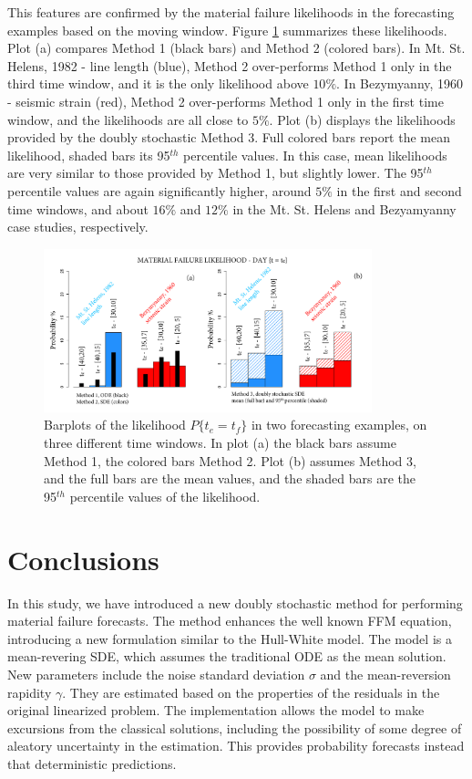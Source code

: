\documentclass{article}
\begin{document}
This features are confirmed by the material failure likelihoods in the forecasting examples based on the moving window. Figure \ref{Fig16} summarizes these likelihoods. Plot (a) compares Method 1 (black bars) and Method 2 (colored bars). In Mt. St. Helens, 1982 - line length (blue), Method 2 over-performs Method 1 only in the third time window, and it is the only likelihood above $10\%$. In Bezymyanny, 1960 - seismic strain (red), Method 2 over-performs Method 1 only in the first time window, and the likelihoods are all close to $5\%$. Plot (b) displays the likelihoods provided by the doubly stochastic Method 3. Full colored bars report the mean likelihood, shaded bars its 95$^{th}$ percentile values. In this case, mean likelihoods are very similar to those provided by Method 1, but slightly lower. The 95$^{th}$ percentile values are again significantly higher, around $5\%$ in the first and second time windows, and about $16\%$ and $12\%$ in the Mt. St. Helens and Bezyamyanny case studies, respectively.

\begin{figure}[H]
\centering
\includegraphics[width=0.85\textwidth]{Fig16_plus.png}
\caption{Barplots of the likelihood $P\{t_e=t_f\}$ in two forecasting examples, on three different time windows. In plot (a) the black bars assume Method 1, the colored bars Method 2. Plot (b) assumes Method 3, and the full bars are the mean values, and the shaded bars are the 95$^{th}$ percentile values of the likelihood.}
\label{Fig16}
\end{figure}

\section{Conclusions}
In this study, we have introduced a new doubly stochastic method for performing material failure forecasts. The method enhances the well known FFM equation, introducing a new formulation similar to the Hull-White model. The model is a mean-revering SDE, which assumes the traditional ODE as the mean solution. New parameters include the noise standard deviation $\sigma$ and the mean-reversion rapidity $\gamma$. They are estimated based on the properties of the residuals in the original linearized problem. The implementation allows the model to make excursions from the classical solutions, including the possibility of some degree of aleatory uncertainty in the estimation. This provides probability forecasts instead that deterministic predictions.
\end{document}
